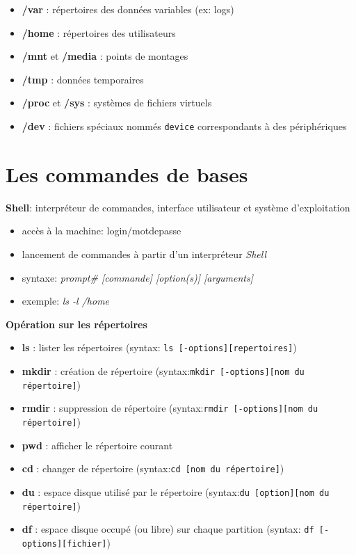 \documentclass[french]{beamer}
\begin{document}
 \begin{frame}
	\begin{itemize}
    \item \textbf{/var} : répertoires des données variables (ex: logs)
    \item \textbf{/home} : répertoires des utilisateurs
    \item \textbf{/mnt} et \textbf{/media} : points de montages    
    \item \textbf{/tmp} : données temporaires
    \item \textbf{/proc} et \textbf{/sys} : systèmes de fichiers virtuels
    \item \textbf{/dev} : fichiers spéciaux nommés \texttt{device} correspondants à des périphériques
    \end{itemize}
\end{frame}


\section{Les commandes de bases} 
\frame{\tableofcontents[current]}

\begin{frame}
\textbf{Shell}: interpréteur de commandes, interface utilisateur et système
d'exploitation
    \begin{itemize}
    \item accès à la machine: login/motdepasse 
    \item lancement de commandes à partir d'un interpréteur \textit{Shell}
    \item syntaxe: \textit{prompt\# [commande] [option(s)] [arguments]}
    \item exemple: \textit{ls -l /home}
    \end{itemize}
\end{frame}

\begin{frame}
\textbf{Opération sur les répertoires}
    \begin{itemize}
    \item \textbf{ls} : lister les répertoires (syntax: \texttt{ls [-options][repertoires]})
    \item \textbf{mkdir} : création de répertoire (syntax:\texttt{mkdir [-options][nom du répertoire]})
    \item \textbf{rmdir} : suppression de répertoire (syntax:\texttt{rmdir [-options][nom du répertoire]})
    \item \textbf{pwd} : afficher le répertoire courant
    \item \textbf{cd} : changer de répertoire (syntax:\texttt{cd [nom du répertoire]})
    \item \textbf{du} : espace disque utilisé par le répertoire (syntax:\texttt{du [option][nom du répertoire]})
    \item \textbf{df} : espace disque occupé (ou libre) sur chaque partition (syntax: \texttt{df [-options][fichier]})
    \end{itemize}
\end{frame}
\end{document}
